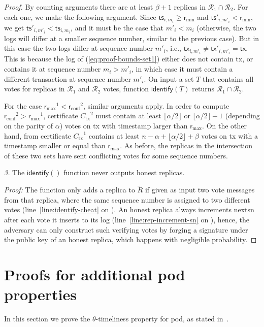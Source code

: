 \documentclass[pdflatex,sn-mathphys-num]{sn-jnl}%
\theoremstyle{thmstyleone}%
\theoremstyle{thmstyletwo}%
\theoremstyle{thmstylethree}%
\newcommand{\podtm}{\textsf{pod}\xspace}
\newcommand{\CR}{\ensuremath{\mathcal{R}}\xspace}
\newcommand{\operand}[1]{\textsf{#1}}
\newcommand{\tx}{\operand{tx}\xspace}
\newcommand{\round}{\operand{r}\xspace}
\newcommand{\rconf}{\ensuremath{\round_\text{conf}}\xspace}
\newcommand{\rmin}{\ensuremath{\round_\text{min}}\xspace}
\newcommand{\rmax}{\ensuremath{\round_\text{max}}\xspace}
\newcommand{\allreps}{\CR}
\newcommand{\tsp}{\operand{ts}\xspace}
\newcommand{\replicas}{\ensuremath{R}\xspace}
\newcommand{\cheaters}{\ensuremath{\tilde{\replicas}}\xspace}
\newcommand{\identify}[1]{\ensuremath{\mathsf{identify}(#1)}\xspace}
\newcommand{\txcert}{\ensuremath{C_\text{tx}}\xspace}
\newcommand{\parTemp}{\ensuremath{\theta}\xspace}
\newcommand{\tran}{\ensuremath{T}\xspace}
\let\oldalpha\alpha
\renewcommand{\alpha}{\ensuremath{\oldalpha}\xspace}
\let\oldbeta\beta
\renewcommand{\beta}{\ensuremath{\oldbeta}\xspace}
\newcommand{\nextsn}{\operand{nextsn}\xspace}
\begin{document}
\begin{appendices}
\begin{proof}
	By counting arguments there are at least $\beta + 1$ replicas in $\allreps_1 \cap \allreps_2$.
	For each one, we make the following argument. Since $\tsp_{i, m_i} \geq \rmin$ and $\tsp'_{i, m'_i} < \rmin$, we get $\tsp'_{i, m'_i} < \tsp_{i, m_i}$, and it must be the case that $m'_i < m_i$ (otherwise, the two logs will differ at a smaller sequence number, similar to the previous case).
	But in this case the two logs differ at sequence number $m'_i$, i.e., $\tx_{i,m'_i} \neq \tx'_{i,m'_i} = \tx$.
	This is because the log of (\ref{eq:proof-bounds-set1}) either does not contain \tx, or contains it at sequence number $m_i > m'_i$, in which case it must contain a different transaction at sequence number $m'_i$.
	On input a set $\tran$ that contains all votes for replicas in $\allreps_1$ and $\allreps_2$ votes, function \identify{\tran} returns $\allreps_1 \cap \allreps_2$.

	For the case $\rmax^1 < \rconf^2$, similar arguments apply.
	In order to compute $\rconf^2 > \rmax^1$, certificate $\txcert^2$ must contain at least $\lfloor \alpha / 2 \rfloor$ or $\lfloor \alpha / 2 \rfloor + 1$ (depending on the parity of $\alpha$) votes on \tx with timestamp larger than \rmax.
	On the other hand, from  certificate $\txcert^1$ contains at least $n - \alpha + \lfloor \alpha / 2 \rfloor + \beta$ votes on \tx with a timestamp smaller or equal than \rmax.
	As before, the replicas in the intersection of these two sets have sent conflicting votes for some sequence numbers.

	\emph{3.}
	The \identify{} function never outputs honest replicas.

	\noindent
	\emph{Proof:} The function only adds a replica to \cheaters if given as input two vote messages from that replica, where the same sequence number is assigned to two different votes (line~\ref{line:identify-cheat} on ). An honest replica always increments \nextsn after each vote it inserts to its log (line~\ref{line:rep-increment-sn} on ), hence, the adversary can only construct such verifying votes by forging a signature under the public key of an honest replica, which happens with negligible probability.
\end{proof}

\section{Proofs for additional \podtm properties}
In this section we prove the $\parTemp$-timeliness property for \podtm, as stated in~.


\end{appendices}
\end{document}
